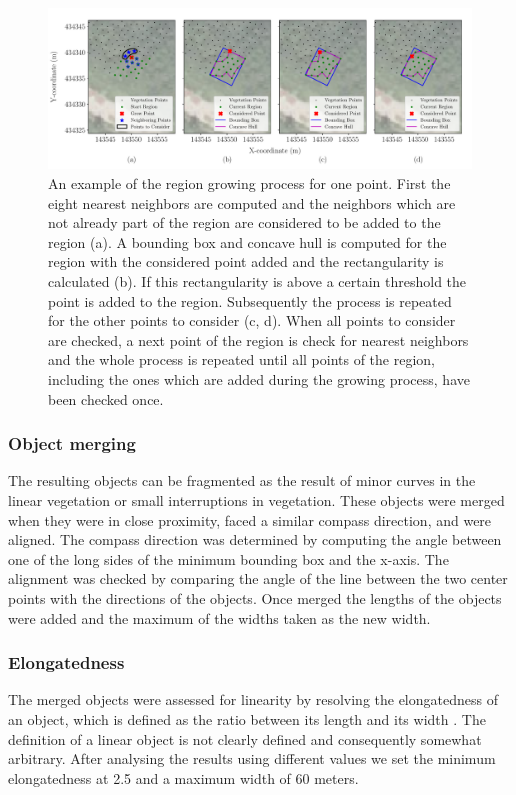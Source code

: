 \begin{figure}
	\centering
	\includegraphics[width=\columnwidth]{./img/region_growing.pdf}
	\caption{An example of the region growing process for one point. First the eight nearest neighbors are computed and the neighbors which are not already part of the region are considered to be added to the region (a). A bounding box and concave hull is computed for the region with the considered point added and the rectangularity is calculated (b). If this rectangularity is above a certain threshold the point is added to the region. Subsequently the process is repeated for the other points to consider (c, d). When all points to consider are checked, a next point of the region is check for nearest neighbors and the whole process is repeated until all points of the region, including the ones which are added during the growing process, have been checked once.}
	\label{fig:regiongrowing}
\end{figure}

\subsubsection{Object merging}
The resulting objects can be fragmented as the result of minor curves in the linear vegetation or small interruptions in vegetation. These objects were merged when they were in close proximity, faced a similar compass direction, and were aligned. The compass direction was determined by computing the angle between one of the long sides of the minimum bounding box and the x-axis. The alignment was checked by comparing the angle of the line between the two center points with the directions of the objects. Once merged the lengths of the objects were added and the maximum of the widths taken as the new width.

\subsubsection{Elongatedness}
The merged objects were assessed for linearity by resolving the elongatedness of an object, which is defined as the ratio between its length and its width \citep{nagao2013structural}. The definition of a linear object is not clearly defined and consequently somewhat arbitrary. After analysing the results using different values we set the minimum elongatedness at 2.5 and a maximum width of 60 meters.

